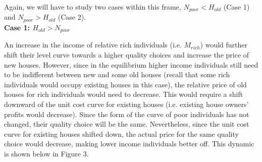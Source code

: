 \documentclass[12pt]{paper}
\begin{document}
Again, we will have to study two cases within this frame,
$N_{poor}<H_{old}$ (Case 1) and $N_{poor}>H_{old}$ (Case 2).
\\

\textbf{Case 1: $H_{old} > N_{poor}$}

An increase in the income of relative rich individuals
(i.e. $M_{rich}$) would further shift their level curve towards a
higher quality choices and increase the price of new houses. However,
since in the equilibrium higher income individuals still need to be
indifferent between new and some old houses (recall that some rich
individuals would occupy existing houses in this case), the relative
price of old houses for rich individuals would need to decrease. This
would require a shift downward of the unit cost curve for existing
houses (i.e. existing house owners' profits would decrease).  Since
the form of the curve of poor individuals has not changed, their
quality choice will be the same. Nevertheless, since the unit cost
curve for existing houses shifted down, the actual price for the same
quality choice would decrease, making lower income individuals better
off. This dynamic is shown below in Figure 3.
\\
\end{document}
